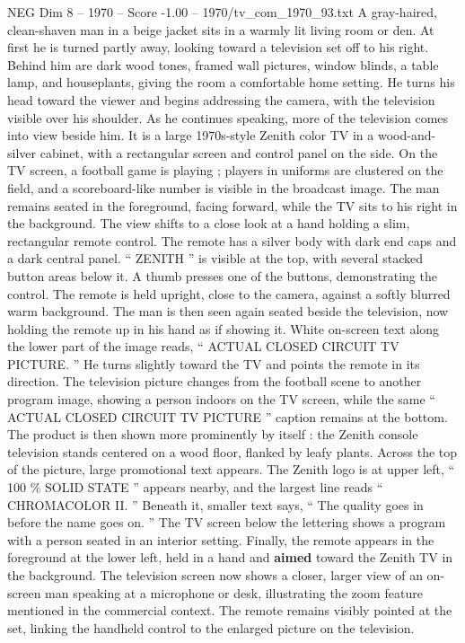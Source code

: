 \begin{textsample}{NEG Dim 8 – 1970 – Score -1.00 – 1970/tv\_com\_1970\_93.txt}  \label{ex:f8_neg_070}
A gray-haired, clean-shaven man in a beige jacket sits in a warmly lit living room or den.
At first he is turned partly away, looking toward a television set off to his right.
Behind him are dark wood tones, framed wall pictures, window blinds, a table lamp, and houseplants, giving the room a comfortable home setting.
He turns his head toward the viewer and begins addressing the camera, with the television visible over his shoulder.
As he continues speaking, more of the television comes into view beside him.
It is a large 1970s-style Zenith color TV in a wood-and-silver cabinet, with a rectangular screen and control panel on the side.
On the TV screen, a football game is playing ; players in uniforms are clustered on the field, and a scoreboard-like number is visible in the broadcast image.
The man remains seated in the foreground, facing forward, while the TV sits to his right in the background.
The view shifts to a close look at a hand holding a slim, rectangular remote control.
The remote has a silver body with dark end caps and a dark central panel. “ ZENITH ” is visible at the top, with several stacked button areas below it.
A thumb presses one of the buttons, demonstrating the control.
The remote is held upright, close to the camera, against a softly blurred warm background.
The man is then seen again seated beside the television, now holding the remote up in his hand as if showing it.
White on-screen text along the lower part of the image reads, “ ACTUAL CLOSED CIRCUIT TV PICTURE. ” He turns slightly toward the TV and points the remote in its direction.
The television picture changes from the football scene to another program image, showing a person indoors on the TV screen, while the same “ ACTUAL CLOSED CIRCUIT TV PICTURE ” caption remains at the bottom.
The product is then shown more prominently by itself : the Zenith console television stands centered on a wood floor, flanked by leafy plants.
Across the top of the picture, large promotional text appears.
The Zenith logo is at upper left, “ 100 \% SOLID STATE ” appears nearby, and the largest line reads “ CHROMACOLOR II. ” Beneath it, smaller text says, “ The quality goes in before the name goes on. ” The TV screen below the lettering shows a program with a person seated in an interior setting.
Finally, the remote appears in the foreground at the lower left, held in a hand and \textbf{aimed} toward the Zenith TV in the background.
The television screen now shows a closer, larger view of an on-screen man speaking at a microphone or desk, illustrating the zoom feature mentioned in the commercial context.
The remote remains visibly pointed at the set, linking the handheld control to the enlarged picture on the television.

\end{textsample}
